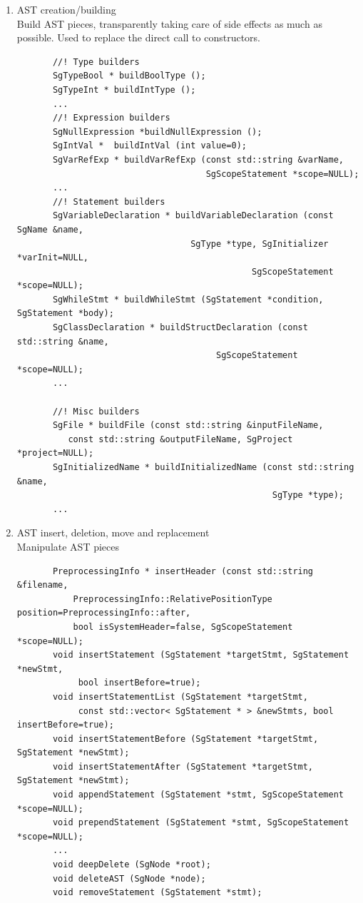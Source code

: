 \begin{enumerate}
\begin{enumerate}
      \item AST creation/building \\      
            Build AST pieces, transparently taking care of side effects as much as possible.
           Used to replace the direct call to constructors. 
       \begin{lstlisting}
       //! Type builders
       SgTypeBool * buildBoolType ();
       SgTypeInt * buildIntType ();
       ...
       //! Expression builders
       SgNullExpression *buildNullExpression ();
       SgIntVal *  buildIntVal (int value=0);
       SgVarRefExp * buildVarRefExp (const std::string &varName, 
                                     SgScopeStatement *scope=NULL);
       ...
       //! Statement builders
       SgVariableDeclaration * buildVariableDeclaration (const SgName &name, 
                                  SgType *type, SgInitializer *varInit=NULL, 
                                              SgScopeStatement *scope=NULL);
       SgWhileStmt * buildWhileStmt (SgStatement *condition, SgStatement *body);
       SgClassDeclaration * buildStructDeclaration (const std::string &name, 
                                       SgScopeStatement *scope=NULL); 
       ...

       //! Misc builders
       SgFile * buildFile (const std::string &inputFileName, 
          const std::string &outputFileName, SgProject *project=NULL);
       SgInitializedName * buildInitializedName (const std::string &name, 
                                                  SgType *type);
       ... 
       \end{lstlisting}

      \item AST insert, deletion, move and replacement \\
            Manipulate AST pieces
       \begin{lstlisting}
       PreprocessingInfo * insertHeader (const std::string &filename, 
           PreprocessingInfo::RelativePositionType position=PreprocessingInfo::after, 
           bool isSystemHeader=false, SgScopeStatement *scope=NULL);
       void insertStatement (SgStatement *targetStmt, SgStatement *newStmt, 
            bool insertBefore=true);
       void insertStatementList (SgStatement *targetStmt, 
            const std::vector< SgStatement * > &newStmts, bool insertBefore=true);
       void insertStatementBefore (SgStatement *targetStmt, SgStatement *newStmt);
       void insertStatementAfter (SgStatement *targetStmt, SgStatement *newStmt);
       void appendStatement (SgStatement *stmt, SgScopeStatement *scope=NULL);
       void prependStatement (SgStatement *stmt, SgScopeStatement *scope=NULL);
       ...
       void deepDelete (SgNode *root);
       void deleteAST (SgNode *node);
       void removeStatement (SgStatement *stmt);
       

\end{lstlisting}
\end{enumerate}
\end{enumerate}
